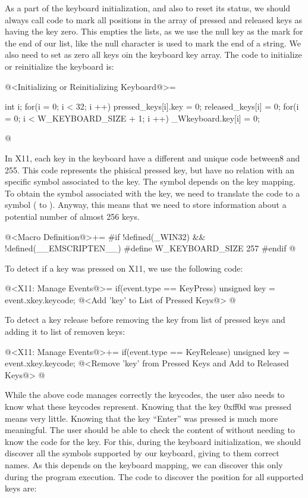As a part of the keyboard initialization, and also to reset its
status, we should always call code to mark all positions in the array
of pressed and released keys as having the key zero. This empties the
lists, as we use the null key as the mark for the end of our list,
like the null character is used to mark the end of a string. We also
need to set as zero all keys oin the keyboard key array. The code to
initialize or reinitialize the keyboard is:

\iniciocodigo
@<Initializing or Reinitializing Keyboard@>=
{
  int i;
  for(i = 0; i < 32; i ++){
    pressed_keys[i].key = 0;
    released_keys[i] = 0;
  }
  for(i = 0; i < W_KEYBOARD_SIZE + 1; i ++)
    _Wkeyboard.key[i] = 0;

}
@
\fimcodigo


In X11, each key in the keyboard have a different and unique code
between8 and 255. This code represents the phisical pressed key, but
have no relation with an specific symbol associated to the key. The
symbol depends on the key mapping. To obtain the symbol associated
with the key, we need to translate the code to a symbol
( to ). Anyway, this means that
we need to store information about a potential number of almost 256
keys.

\iniciocodigo
@<Macro Definition@>+=
#if !defined(_WIN32) && !defined(__EMSCRIPTEN__)
#define W_KEYBOARD_SIZE 257
#endif
@
\fimcodigo

To detect if a key was pressed on X11, we use the following code:

\iniciocodigo
@<X11: Manage Events@>=
if(event.type == KeyPress){
  unsigned key = event.xkey.keycode;
  @<Add 'key' to List of Pressed Keys@>
}
@
\fimcodigo

To detect a key release before removing the key from list of pressed
keys and adding it to list of removen keys:

\iniciocodigo
@<X11: Manage Events@>+=
if(event.type == KeyRelease){
  unsigned key = event.xkey.keycode;
  @<Remove 'key' from Pressed Keys and Add to Released Keys@>
}
@
\fimcodigo

While the above code manages correctly the keycodes, the user also
needs to know what these keycodes represent. Knowing that the key
0xff0d was pressed means very little. Knowing that the key ``Enter''
was pressed is much more meaningful. The user should be able to check
the content of  without needing
to know the code for the key. For this, during the keyboard
initialization, we should discover all the symbols supported by our
keyboard, giving to them correct names. As this depends on the
keyboard mapping, we can discover this only during the program
execution. The code to discover the position for all supported keys
are:

